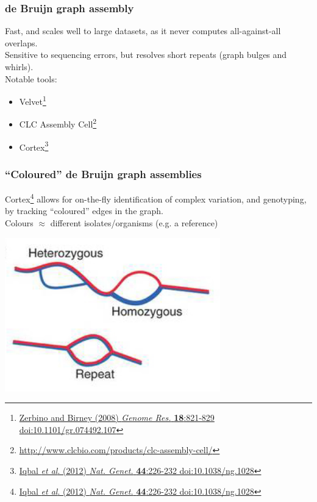\begin{frame}
  \frametitle{de Bruijn graph assembly}
  Fast, and scales well to large datasets, as it never computes all-against-all overlaps.\\[0.5cm]
  Sensitive to sequencing errors, but resolves short repeats (graph bulges and whirls).\\[0.5cm]
  Notable tools:
  \begin{itemize}
    \item Velvet\footnote{\tiny{\href{http://dx.doi.org/10.1101/gr.074492.107}{Zerbino and Birney (2008) \textit{Genome Res.} \textbf{18}:821-829 doi:10.1101/gr.074492.107}}}
    \item CLC Assembly Cell\footnote{\tiny{\href{http://www.clcbio.com/products/clc-assembly-cell/}{http://www.clcbio.com/products/clc-assembly-cell/}}}
    \item Cortex\footnote{\tiny{\href{http://dx.doi.org/10.1038/ng.1028}{Iqbal \textit{et al}. (2012) \textit{Nat. Genet.} \textbf{44}:226-232 doi:10.1038/ng.1028}}}
  \end{itemize}
\end{frame}

\begin{frame}
  \frametitle{``Coloured'' de Bruijn graph assemblies}
  Cortex\footnote{\tiny{\href{http://dx.doi.org/10.1038/ng.1028}{Iqbal \textit{et al}. (2012) \textit{Nat. Genet.} \textbf{44}:226-232 doi:10.1038/ng.1028}}} allows for on-the-fly identification of complex variation, and genotyping, by tracking ``coloured'' edges in the graph.\\
  Colours $\approx$ different isolates/organisms (e.g. a reference)
  \begin{center}
    \includegraphics[width=0.7\textwidth]{images/cortex_uses}
  \end{center}  
\end{frame}


